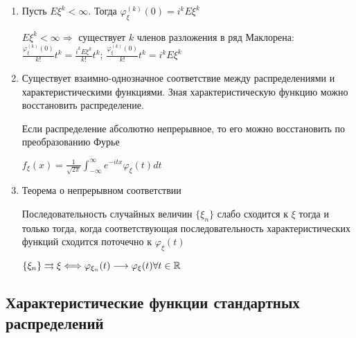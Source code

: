 \documentclass[12pt]{article}
\begin{document}
\begin{enumerate}
    \item Пусть $E\xi^k < \infty$. Тогда $\varphi_\xi^{(k)}(0) = i^k E\xi^k$

    \begin{MyProof}
        $E\xi^k < \infty \Longrightarrow$ существует $k$ членов разложения в ряд Маклорена: 
        $\frac{\varphi_\xi^{(k)}(0)}{k!}t^k = \frac{i^k E\xi^k}{k!} t^k$; $\frac{\varphi_\xi^{(k)}(0)}{k!}t^k = i^k E\xi^k$
    \end{MyProof}

    \item Существует взаимно-однозначное соответствие между распределениями и характеристическими функциями.
    Зная характеристическую функцию можно восстановить распределение.

    \Ex Если распределение абсолютно непрерывное, то его можно восстановить по преобразованию Фурье

    $f_\xi(x) = \frac{1}{\sqrt{2\pi}} \int_{-\infty}^{\infty} e^{-itx} \varphi_\xi(t) dt$

    \item Теорема о непрерывном соответствии
    
    \begin{MyTheorem}
        \Ths Последовательность случайных величин $\{\xi_n\}$ слабо сходится к $\xi$ тогда и только тогда, когда
        соответствующая последовательность характеристических функций сходится поточечно к $\varphi_\xi(t)$

        $\{\xi_n\} \rightrightarrows \xi \Longleftrightarrow \varphi_{\xi_n}(t) \longrightarrow \varphi_\xi(t) \forall t \in \mathbb{R}$
    \end{MyTheorem}

\end{enumerate}

\subsection{Характеристические функции стандартных распределений}
\end{document}
